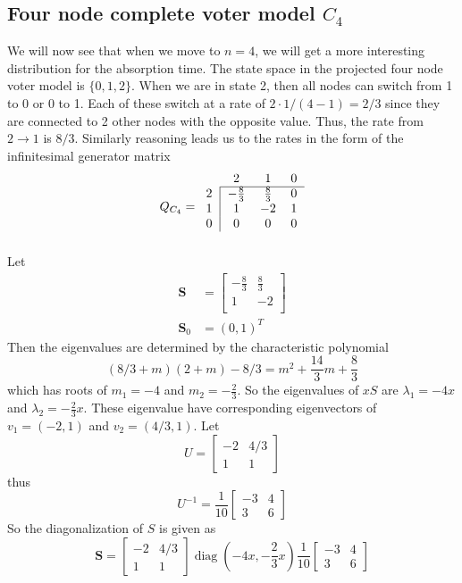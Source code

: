 \subsection{Four node complete voter model \texorpdfstring{$C_4$}{VC4}}
We will now see that when we move to $n = 4$, we will get a more interesting distribution for the absorption time.
The state space in the projected four node voter model is $\{0,1,2\}$.
When we are in state 2, then all nodes can switch from 1 to 0 or 0 to 1.
Each of these switch at a rate of $2 \cdot 1/(4 - 1) = 2/3$ since they are connected to 2 other nodes with the opposite value.
Thus, the rate from $2 \to 1$ is $8/3$.
Similarly reasoning leads us to the rates in the form of the infinitesimal generator matrix
$$
Q_{C_4} = \begin{blockarray}{cccc}
    & 2 & 1 & 0\\
    \begin{block}{c|ccc}
        \cline{2-4}
        2 & -\frac{8}{3} & \frac{8}{3} & 0 \\
        1 & 1 & -2 & 1\\
        0 & 0 & 0 & 0\\
    \end{block}
\end{blockarray}
$$
Let
\begin{align*}
    \mathbf{S} &= \begin{bmatrix}
    -\frac{8}{3} & \frac{8}{3}\\
    1 & -2\\
    \end{bmatrix}\\
    \mathbf{S}_0 &= (0, 1)^T
\end{align*}
Then the eigenvalues are determined by the characteristic polynomial
$$
(8/3 + m)(2 + m) - 8/3 = m^2 + \frac{14}{3} m + \frac{8}{3}
$$
which has roots of $m_1 = -4$ and $m_2 = - \frac{2}{3}$.
So the eigenvalues of $xS$ are $\lambda_1 = -4x$ and $\lambda_2 =  - \frac{2}{3} x$.
These eigenvalue have corresponding eigenvectors of $v_1 = (-2, 1)$ and $v_2 = (4/3, 1)$.
Let
$$
U = \begin{bmatrix}
    -2 & 4/3\\
    1 & 1
\end{bmatrix}
$$
thus
$$
U^{-1} = \frac{1}{10} \begin{bmatrix}
    -3 & 4\\
    3 & 6
\end{bmatrix}
$$
So the diagonalization of $S$ is given as
$$
\mathbf{S} = \begin{bmatrix}
    -2 & 4/3\\
    1 & 1
\end{bmatrix} \operatorname{diag}(-4x, - \frac{2}{3} x)
\frac{1}{10} \begin{bmatrix}
    -3 & 4\\
    3 & 6
\end{bmatrix}
$$

